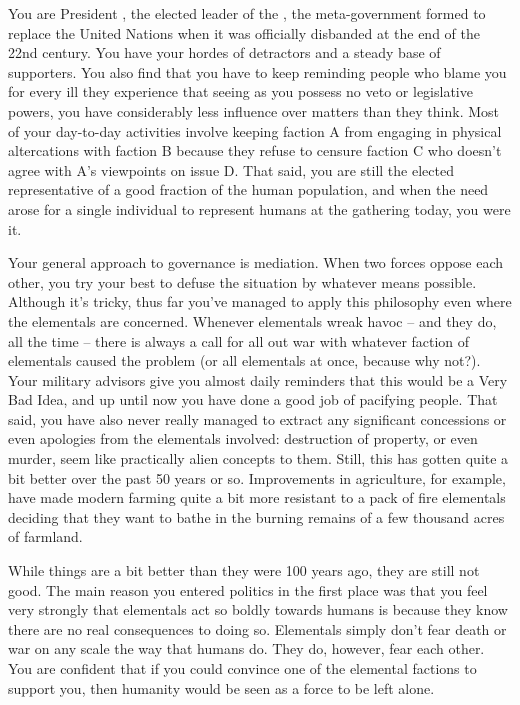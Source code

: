 \documentclass[char]{elementals}
\begin{document}
\name{\cLeader{}}

You are President \cLeader{\intro}, the elected leader of the \cNewUN{\intro}, the meta-government formed to replace the United Nations when it was officially disbanded at the end of the 22nd century. You have your hordes of detractors and a steady base of supporters. You also find that you have to keep reminding people who blame you for every ill they experience that seeing as you possess no veto or legislative powers, you have considerably less influence over matters than they think. Most of your day-to-day activities involve keeping faction A from engaging in physical altercations with faction B because they refuse to censure faction C who doesn't agree with A's viewpoints on issue D. That said, you are still the elected representative of a good fraction of the human population, and when the need arose for a single individual to represent humans at the gathering today, you were it.

Your general approach to governance is mediation. When two forces oppose each other, you try your best to defuse the situation by whatever means possible. Although it's tricky, thus far you've managed to apply this philosophy even where the elementals are concerned. Whenever elementals wreak havoc -- and they do, all the time -- there is always a call for all out war with whatever faction of elementals caused the problem (or all elementals at once, because why not?). Your military advisors give you almost daily reminders that this would be a Very Bad Idea, and up until now you have done a good job of pacifying people. That said, you have also never really managed to extract any significant concessions or even apologies from the elementals involved: destruction of property, or even murder, seem like practically alien concepts to them. Still, this has gotten quite a bit better over the past 50 years or so. Improvements in agriculture, for example, have made modern farming quite a bit more resistant to a pack of fire elementals deciding that they want to bathe in the burning remains of a few thousand acres of farmland.

While things are a bit better than they were 100 years ago, they are still not good. The main reason you entered politics in the first place was that you feel very strongly that elementals act so boldly towards humans is because they know there are no real consequences to doing so. Elementals simply don't fear death or war on any scale the way that humans do. They do, however, fear each other. You are confident that if you could convince one of the elemental factions to support you, then humanity would be seen as a force to be left alone.
\end{document}
